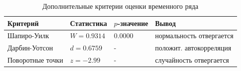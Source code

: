 \begin{table}[h!]
\centering
\caption{Дополнительные критерии оценки временного ряда}
\label{tab:extra_tests}
\begin{tabular}{llll}
\toprule
Критерий & Статистика & $p$-значение & Вывод \\
\midrule
Шапиро-Уилк & $W=0.9314$ & 0.0000 & нормальность отвергается \\
Дарбин-Уотсон & $d=0.6759$ & - & положит. автокорреляция \\
Поворотные точки & $z=-2.99$ & - & случайность отвергается \\
\bottomrule
\end{tabular}
\end{table}
